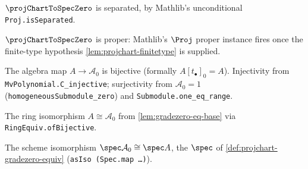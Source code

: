 \begin{lemma}

  \label{lem:projchart-separated}
  $\projChartToSpecZero$ is separated, by Mathlib's unconditional
  \texttt{Proj.isSeparated}.
\end{lemma}

\begin{lemma}

  \label{lem:projchart-proper}
  $\projChartToSpecZero$ is proper: Mathlib's $\Proj$ proper instance fires once
  the finite-type hypothesis \cref{lem:projchart-finitetype} is supplied.
\end{lemma}

\begin{lemma}

  \label{lem:gradezero-eq-base}
  The algebra map $A \to \mathcal A_0$ is bijective (formally $A[t_\bullet]_0 =
  A$). Injectivity from \texttt{MvPolynomial.C\_injective}; surjectivity from
  $\mathcal A_0 = 1$ (\texttt{homogeneousSubmodule\_zero}) and
  \texttt{Submodule.one\_eq\_range}.
\end{lemma}

\begin{definition}

  \label{def:projchart-gradezero-equiv}
  The ring isomorphism $A \cong \mathcal A_0$ from
  \cref{lem:gradezero-eq-base} via \texttt{RingEquiv.ofBijective}.
\end{definition}

\begin{definition}

  \label{def:spec-gradezero-iso-base}
  The scheme isomorphism $\spec\mathcal A_0 \cong \spec A$, the $\spec$ of
  \cref{def:projchart-gradezero-equiv} (\texttt{asIso (Spec.map \dots)}).
\end{definition}


